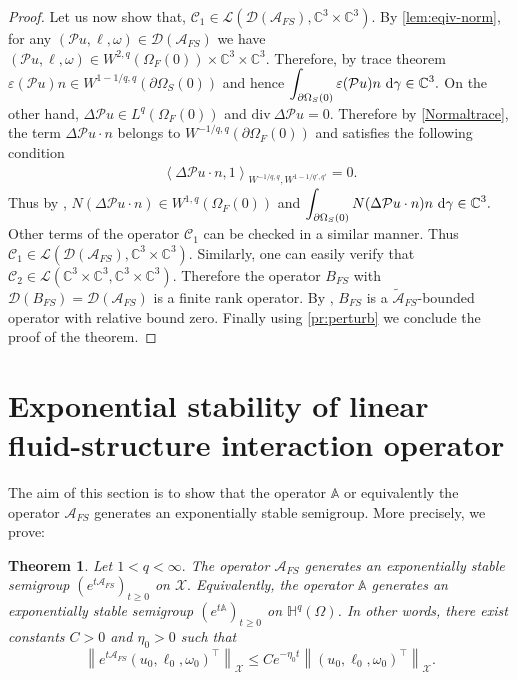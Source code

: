 \documentclass[12pt,a4paper,reqno]{amsart}
\newtheorem{theorem}{Theorem}[section]
\theoremstyle{definition}
\theoremstyle{remark}
\numberwithin{equation}{section}
\newcommand{\oso}{\Omega_{S}(0)}
\newcommand{\ofo}{\Omega_{F}(0)}
\newcommand{\ct}{\mathbb{C}^{3}}
\newcommand{\ds}{\displaystyle}
\newcommand{\poso}{\partial\oso}
\newcommand{\mx}{\mathcal{X}}
\newcommand{\mpp}{\mathcal{P}}
\newcommand{\dg}{{\rm d} \gamma}
\begin{document}
\begin{proof}
Let us now show that,  $\mathcal{C}_{1} \in \mathcal{L}(\mathcal{D}(\mathcal{A}_{FS}), \ct\times \ct).$ By \cref{lem:eqiv-norm}, for any $(\mpp u, \ell, \omega) \in \mathcal{D}(\mathcal{A}_{FS})$ we have $(\mpp u, \ell, \omega) \in W^{2,q}(\ofo) \times \ct \times \ct.$ Therefore, by trace theorem  $\varepsilon(\mpp u) n \in W^{1-1/q,q}(\poso)$ and hence $\ds \int_{\poso} \varepsilon(\mpp u)n \ \dg \in \ct.$ On the other hand, $\Delta \mpp u \in L^{q}(\ofo)$ and $\mathrm{div} \ \Delta\mpp u = 0.$ Therefore by \cref{Normaltrace}, the term $\Delta \mpp u \cdot n$ belongs to $W^{-1/q,q}(\partial\ofo)$ and satisfies the following condition
\begin{align*}
\left\langle \Delta \mpp u\cdot n , 1 \right\rangle_{W^{-1/q,q}, W^{1-1/q',q'}}  = 0.
\end{align*}
Thus by \cite[Theorem 9.2]{Fab98},  $N (\Delta \mpp u \cdot n) \in W^{1,q}(\ofo)$ and $\ds \int_{\partial\oso} N (\Delta \mpp u \cdot n) n \ \dg \in \ct.$ Other terms of the operator $\mathcal{C}_{1}$ can be checked in a similar manner.  Thus $\mathcal{C}_{1} \in \mathcal{L}(\mathcal{D}(\mathcal{A}_{FS}), \ct\times \ct).$ Similarly, one can easily verify that $\mathcal{C}_{2} \in \mathcal{L}(\ct\times \ct, \ct\times \ct).$ Therefore the operator $B_{FS}$ with $\mathcal{D}(B_{FS}) = \mathcal{D}(\mathcal{A}_{FS})$ is a finite rank operator. By \cite[Chapter III, Lemma 2.16]{Eng-Nag}, $B_{FS}$ is a $\widetilde{\mathcal{A}}_{FS}$-bounded operator with relative bound zero. Finally using \cref{pr:perturb} we conclude the proof of the theorem.
\end{proof}



\section{Exponential stability of linear fluid-structure interaction operator} \label{sec:exp}
The aim of this section is to show that the operator $\mathbb{A}$ or equivalently the operator $\mathcal{A}_{FS}$ generates an exponentially stable semigroup.  More precisely, we prove:

\begin{theorem} \label{th:exp-st}
Let $1 < q < \infty.$ The operator $\mathcal{A}_{FS}$ generates an exponentially stable semigroup $\ds \left( e^{t\mathcal{A}_{FS}}\right)_{t \geqslant 0}$ on $\mx.$ Equivalently,  the operator $\mathbb{A}$ generates an exponentially stable semigroup $\ds \left( e^{t\mathbb{A}}\right)_{t \geqslant 0}$ on $\mathbb{H}^{q}(\Omega)$. In other words, there exist constants $C> 0$ and $\eta_{0} > 0$ such that
\begin{equation}
\left\|e^{t\mathcal{A}_{FS}}(u_{0}, \ell_{0}, \omega_{0})^{\top} \right\|_{\mathcal{X}} \leqslant C e^{-\eta_{0} t} \left\|(u_{0}, \ell_{0}, \omega_{0})^{\top}\right\|_{\mathcal{X}}.
\end{equation}
\end{theorem}
\end{document}
